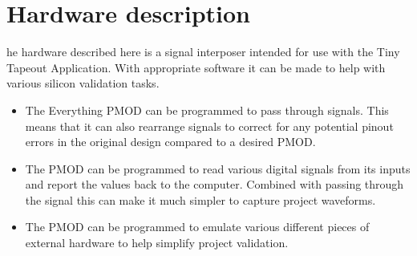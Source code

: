 \section{Hardware description}
he hardware described here is a signal interposer intended for use with the Tiny Tapeout Application.
With appropriate software it can be made to help with various silicon validation tasks.
\begin{itemize}
    \item The Everything PMOD can be programmed to pass through signals. 
    This means that it can also rearrange signals to correct for any potential pinout errors in the original design compared to a desired PMOD.
    \item The PMOD can be programmed to read various digital signals from its inputs and report the values back to the computer. 
    Combined with passing through the signal this can make it much simpler to capture project waveforms.
    \item The PMOD can be programmed to emulate various different pieces of external hardware to help simplify project validation.
\end{itemize}